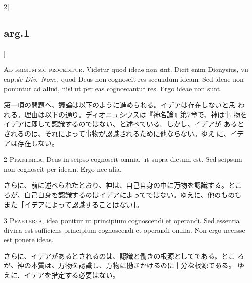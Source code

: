 \documentclass[paper=a4paper,fontsize=10pt,jafontsize=9pt,titlepage]{jlreq}
\begin{document}
\begin{paracol}{2}[\subsection{arg.1}]

{\huge A}{\scshape d primum sic proceditur}. Videtur quod ideae non
sint. Dicit enim Dionysius, {\scshape vii} cap.{\itshape de Div.~Nom}.,
quod Deus non cognoscit res secundum ideam. Sed ideae non ponuntur ad
aliud, nisi ut per eas cognoscantur res. Ergo ideae non sunt.

\switchcolumn

第一項の問題へ、議論は以下のように進められる。イデアは存在しないと思
 われる。理由は以下の通り。ディオニュシウスは『神名論』第7章で、神は事
 物をイデアに即して認識するのではない、と述べている。しかし、イデアが
 あるとされるのは、それによって事物が認識されるために他ならない。ゆえ
 に、イデアは存在しない。


{\scshape 2 Praeterea}, Deus in seipso cognoscit omnia, ut supra
dictum est. Sed seipsum non cognoscit per ideam. Ergo nec alia.

\switchcolumn

さらに、前に述べられたとおり、神は、自己自身の中に万物を認識する。とこ
ろが、自己自身を認識するのはイデアによってではない。ゆえに、他のものも
また［イデアによって認識することはない］。


{\scshape 3 Praeterea}, idea ponitur ut principium
cognoscendi et operandi. Sed essentia divina est sufficiens principium
cognoscendi et operandi omnia. Non ergo necesse est ponere ideas.

\switchcolumn

さらに、イデアがあるとされるのは、認識と働きの根源としてである。とこ
 ろが、神の本質は、万物を認識し、万物に働きかけるのに十分な根源である。
 ゆえに、イデアを措定する必要はない。

\switchcolumn*[\subsection{s.c.}]


\end{paracol}
\end{document}
